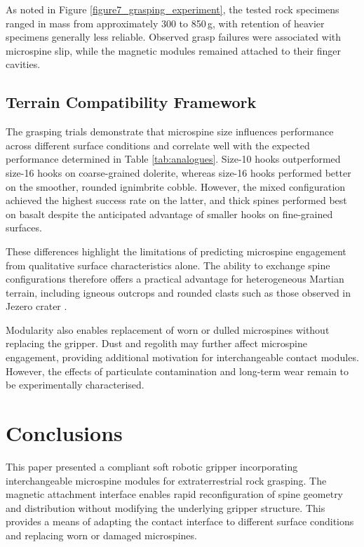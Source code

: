 \documentclass[letterpaper, 10 pt, conference, twoside]{ieeetran}
\begin{document}
As noted in Figure \ref{figure7_grasping_experiment}, the tested rock specimens ranged in mass from approximately 300 to 850\,g, with retention of heavier specimens generally less reliable. Observed grasp failures were associated with microspine slip, while the magnetic modules remained attached to their finger cavities.


\subsection{Terrain Compatibility Framework}

The grasping trials demonstrate that microspine size influences performance across different surface conditions and correlate well with the expected performance determined in Table \ref{tab:analogues}. Size-10 hooks outperformed size-16 hooks on coarse-grained dolerite, whereas size-16 hooks performed better on the smoother, rounded ignimbrite cobble. However, the mixed configuration achieved the highest success rate on the latter, and thick spines performed best on basalt despite the anticipated advantage of smaller hooks on fine-grained surfaces.

These differences highlight the limitations of predicting microspine engagement from qualitative surface characteristics alone. The ability to exchange spine configurations therefore offers a practical advantage for heterogeneous Martian terrain, including igneous outcrops and rounded clasts such as those observed in Jezero crater \cite{Farley2022JezeroIgneous,Mangold2021JezeroDelta}.

Modularity also enables replacement of worn or dulled microspines without replacing the gripper. Dust and regolith may further affect microspine engagement, providing additional motivation for interchangeable contact modules. However, the effects of particulate contamination and long-term wear remain to be experimentally characterised.


\section{Conclusions}

This paper presented a compliant soft robotic gripper incorporating interchangeable microspine modules for extraterrestrial rock grasping. The magnetic attachment interface enables rapid reconfiguration of spine geometry and distribution without modifying the underlying gripper structure. This provides a means of adapting the contact interface to different surface conditions and replacing worn or damaged microspines.
\end{document}
